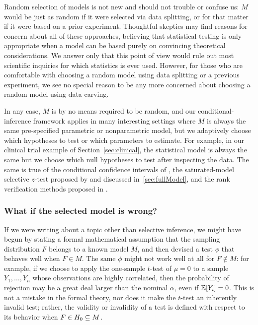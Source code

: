 \documentclass{article}
\theoremstyle{definition}
\newcommand{\sampOrData}{data }
\begin{document}
Random selection of models is not new and should not trouble or confuse us: $M$ would be just as random if it were selected via data splitting, or for that matter if it were based on a prior experiment.
Thoughtful skeptics may find reasons for concern about all of these approaches, believing that statistical testing is only appropriate when a model can be based purely on convincing theoretical considerations. We answer only that this point of view would rule out most scientific inquiries for which statistics is ever used. However, for those who are comfortable with choosing a random model using \sampOrData splitting or a previous experiment, we see no special reason to be any more concerned about choosing a random model using \sampOrData carving.

In any case, $M$ is by no means required to be random, and our conditional-inference framework applies in many interesting settings where $M$ is always the same pre-specified parametric or nonparametric model, but we adaptively choose which hypotheses to test or which parameters to estimate. For example, in our clinical trial example of Section~\ref{sec:clinical}, the statistical model is always the same but we choose which null hypotheses to test after inspecting the data. The same is true of the conditional confidence intervals of \citet{weinstein2013selection}, the saturated-model selective $z$-test proposed by \citet{lee2016exact} and discussed in~\ref{sec:fullModel}, and the rank verification methods proposed in \citet{hung2016rank}.

\subsubsection{What if the selected model is wrong?}\label{sec:modelWrong}

If we were writing about a topic other than selective inference, we might have begun by stating a formal mathematical assumption that the sampling distribution $F$ belongs to a known model $M$, and then devised a test $\phi$ that behaves well when $F\in M$. The same $\phi$ might not work well at all for $F\notin M$: for example, if we choose to apply the one-sample $t$-test of $\mu=0$ to a sample $Y_1,\ldots,Y_n$ whose observations are highly correlated, then the probability of rejection may be a great deal larger than the nominal $\alpha$, even if $\mathbb{E}[Y_i]=0$. This is not a mistake in the formal theory, nor does it make the $t$-test an inherently invalid test; rather, the validity or invalidity of a test is defined with respect to its behavior when $F\in H_0 \subseteq M$.
\end{document}
